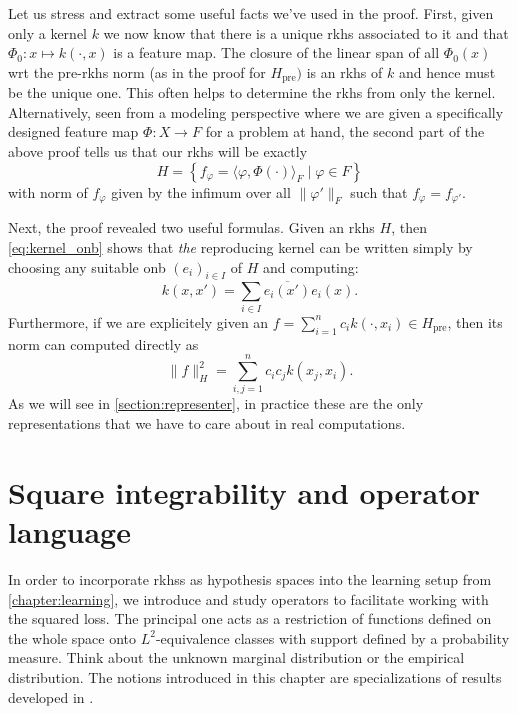 
Let us stress and extract some useful facts we've used in the proof.
First, given only a kernel $k$ we now know that there is a unique rkhs
associated to it and that $\Phi_0 \colon x \mapsto k(\cdot,x)$ is a 
feature map.
The closure of the linear span of all $\Phi_0(x)$ wrt the 
pre-rkhs norm (as in the proof for $H_{\textrm{pre}})$ is 
an rkhs of $k$ and hence must be the unique one.
This often helps to determine the rkhs from only the kernel.
Alternatively, seen from a modeling perspective where
we are given a specifically designed feature 
map $\Phi \colon X \to F$ for a problem at hand, 
the second part of the above proof tells us that our
rkhs will be exactly
\begin{equation*}
    H = \left\{ f_\varphi = \langle \varphi,\Phi(\cdot) \rangle_F 
    \mid \varphi \in F \right\}
\end{equation*}
with norm of $f_\varphi$ given by the infimum over all $\|\varphi'\|_F$
such that $f_\varphi = f_{\varphi'}$.

Next, the proof revealed two useful formulas.
Given an rkhs $H$, then \cref{eq:kernel_onb} shows that \emph{the} 
reproducing kernel can be written simply by choosing any suitable onb 
$(e_i)_{i \in I}$ of $H$ and computing:
\begin{equation*}
    k(x,x') = \sum_{i \in I} \overline{e_i(x')} e_i(x).
\end{equation*}
Furthermore, if we are explicitely given an 
$f = \sum_{i=1}^n c_i k(\cdot,x_i) \in H_{\textrm{pre}}$,
then its norm can computed directly as 
\begin{equation*}
    \| f \|^2_H = \sum_{i,j = 1}^n c_i c_j k(x_j,x_i).
\end{equation*}
As we will see in \cref{section:representer}, 
in practice these are the only representations that we have to care 
about in real computations.

\section{Square integrability and operator language}

In order to incorporate rkhss as hypothesis spaces into the 
learning setup from \cref{chapter:learning}, we introduce 
and study operators to facilitate working with the squared loss.
The principal one acts as a restriction of functions defined 
on the whole space onto $L^2$-equivalence classes with support 
defined by a probability measure.
Think about the unknown marginal distribution or the empirical
distribution.
The notions introduced in this chapter are specializations of 
results developed in \cite{devito_vvrkhs}.

